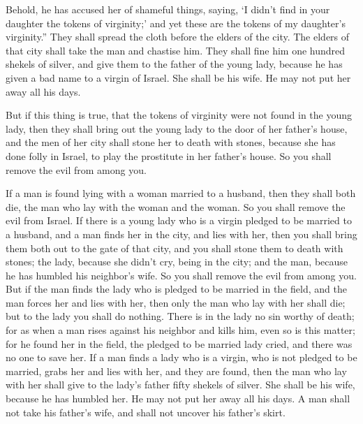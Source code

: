 {Behold, he has accused her of shameful things, saying, ‘I didn’t find in your daughter the tokens of virginity;’ and yet these are the tokens of my daughter’s virginity.” They shall spread the cloth before the elders of the city.
The elders of that city shall take the man and chastise him.
They shall fine him one hundred shekels of silver, and give them to the father of the young lady, because he has given a bad name to a virgin of Israel. She shall be his wife. He may not put her away all his days.
\par }{\PP {}But if this thing is true, that the tokens of virginity were not found in the young lady,
then they shall bring out the young lady to the door of her father’s house, and the men of her city shall stone her to death with stones, because she has done folly in Israel, to play the prostitute in her father’s house. So you shall remove the evil from among you.
\par }{\PP {}If a man is found lying with a woman married to a husband, then they shall both die, the man who lay with the woman and the woman. So you shall remove the evil from Israel.
If there is a young lady who is a virgin pledged to be married to a husband, and a man finds her in the city, and lies with her,
then you shall bring them both out to the gate of that city, and you shall stone them to death with stones; the lady, because she didn’t cry, being in the city; and the man, because he has humbled his neighbor’s wife. So you shall remove the evil from among you.
But if the man finds the lady who is pledged to be married in the field, and the man forces her and lies with her, then only the man who lay with her shall die;
but to the lady you shall do nothing. There is in the lady no sin worthy of death; for as when a man rises against his neighbor and kills him, even so is this matter;
for he found her in the field, the pledged to be married lady cried, and there was no one to save her.
If a man finds a lady who is a virgin, who is not pledged to be married, grabs her and lies with her, and they are found,
then the man who lay with her shall give to the lady’s father fifty shekels of silver. She shall be his wife, because he has humbled her. He may not put her away all his days.
A man shall not take his father’s wife, and shall not uncover his father’s skirt.

}
